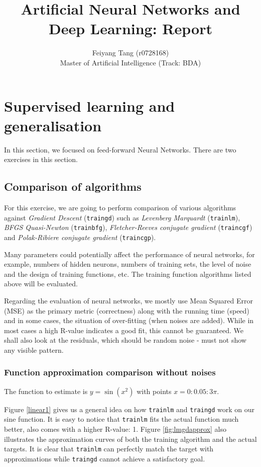 \documentclass{article}
\title{Artificial Neural Networks and Deep Learning: Report}
\author{Feiyang Tang (r0728168)\\
Master of Artificial Intelligence (Track: BDA)}
\date{}
\begin{document}
\maketitle

\section{Supervised learning and generalisation}
In this section, we focused on feed-forward Neural Networks. There are two exercises in this section.

\subsection{Comparison of algorithms}
For this exercise, we are going to perform comparison of various algorithms against \textit{Gradient Descent} (\verb|traingd|) such as \textit{Levenberg Marquardt} (\verb|trainlm|), \textit{BFGS Quasi-Newton} (\verb|trainbfg|), \textit{Fletcher-Reeves conjugate gradient} (\verb|traincgf|) and \textit{Polak-Ribiere conjugate gradient} (\verb|traincgp|).

Many parameters could potentially affect the performance of neural networks, for example, numbers of hidden neurons, numbers of training sets, the level of noise and the design of training functions, etc. The training function algorithms listed above will be evaluated.

Regarding the evaluation of neural networks, we mostly use Mean Squared Error (MSE) as the primary metric (correctness) along with the running time (speed) and in some cases, the situation of over-fitting (when noises are added). While in most cases a high R-value indicates a good fit, this cannot be guaranteed. We shall also look at the residuals, which should be random noise - must not show any visible pattern. 

\subsubsection{Function approximation comparison without noises}
The function to estimate is $y=\sin \left(x^{2}\right)$ with points $x=0: 0.05: 3 \pi$.

Figure \ref{linear1} gives us a general idea on how \verb|trainlm| and \verb|traingd| work on our sine function. It is easy to notice that \verb|trainlm| fits the actual function much better, also comes with a higher R-value: 1. Figure \ref{fig:lmgdapprox} also illustrates the approximation curves of both the training algorithm and the actual targets. It is clear that \verb|trainlm| can perfectly match the target with approximations while \verb|traingd| cannot achieve a satisfactory goal.
\end{document}
